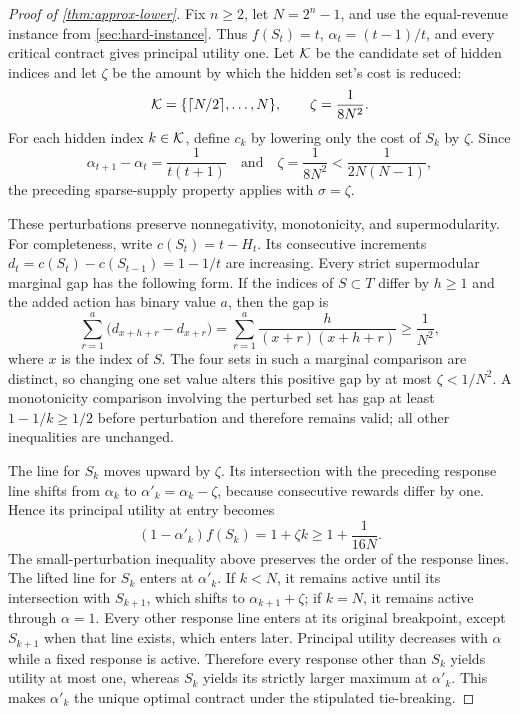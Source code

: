 \documentclass[11pt]{article}
\begin{document}
\begin{proof}[Proof of \cref{thm:approx-lower}]
Fix $n\geq2$, let $N=2^n-1$, and use the equal-revenue instance from
\cref{sec:hard-instance}.  Thus $f(S_t)=t$,
$\alpha_t=(t-1)/t$, and every critical contract gives principal utility
one.  Let ${\cal K}$ be the candidate set of hidden indices and let $\zeta$
be the amount by which the hidden set's cost is reduced:
\[
 {\cal K}=\{\lceil N/2\rceil,\ldots,N\},
 \qquad
 \zeta=\frac{1}{8N^2}.
\]
For each hidden index $k\in{\cal K}$, define $c_k$ by lowering only the cost
of $S_k$ by $\zeta$.
Since
\[
 \alpha_{t+1}-\alpha_t=\frac{1}{t(t+1)}
 \quad\text{and}\quad
 \zeta=\frac{1}{8N^2}
 <\frac{1}{2N(N-1)},
\]
the preceding sparse-supply property applies with $\sigma=\zeta$.

These perturbations preserve nonnegativity, monotonicity, and
supermodularity.  For completeness, write
$c(S_t)=t-H_t$.  Its consecutive increments
$d_t=c(S_t)-c(S_{t-1})=1-1/t$ are increasing.  Every strict
supermodular marginal gap has the following form.  If the indices of
$S\subset T$ differ by $h\geq1$ and the added action has binary value $a$,
then the gap is
\[
 \sum_{r=1}^{a}\bigl(d_{x+h+r}-d_{x+r}\bigr)
 =
 \sum_{r=1}^{a}\frac{h}{(x+r)(x+h+r)}
 \geq\frac1{N^2},
\]
where $x$ is the index of $S$.  The four sets in such a marginal comparison
are distinct, so changing one set value alters this positive gap by at most
$\zeta<1/N^2$.  A monotonicity comparison involving the perturbed set has
gap at least $1-1/k\geq1/2$ before perturbation and therefore remains valid;
all other inequalities are unchanged.

The line for $S_k$ moves upward by $\zeta$.  Its intersection with the
preceding response line shifts from $\alpha_k$ to
$\alpha'_k=\alpha_k-\zeta$, because consecutive rewards differ by one.
Hence its principal utility at entry becomes
\[
                 (1-\alpha'_k)f(S_k)=1+\zeta k
                 \geq1+\frac{1}{16N}.
\]
The small-perturbation inequality above preserves the order of the response
lines.  The lifted line for $S_k$ enters at $\alpha'_k$.  If $k<N$, it
remains active until its intersection with $S_{k+1}$, which shifts to
$\alpha_{k+1}+\zeta$; if $k=N$, it remains active through $\alpha=1$.
Every other response line enters at its original breakpoint, except
$S_{k+1}$ when that line exists, which enters later.  Principal utility
decreases with $\alpha$ while a fixed response is active.  Therefore every
response other than $S_k$ yields utility at most one, whereas $S_k$ yields
its strictly larger maximum at $\alpha'_k$.  This makes $\alpha'_k$ the
unique optimal contract under the stipulated tie-breaking.


\end{proof}
\end{document}
